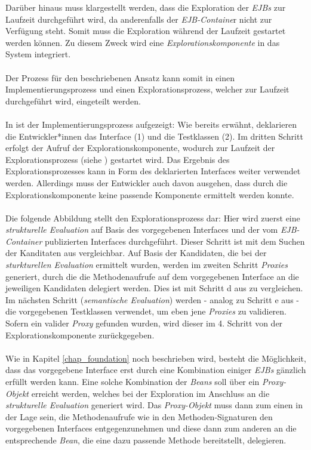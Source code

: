 Darüber hinaus muss klargestellt werden, dass die Exploration der \emph{EJBs} zur Laufzeit durchgeführt wird, da anderenfalls der \emph{EJB-Containe}r nicht zur Verfügung steht. Somit muss die Exploration während der Laufzeit gestartet werden können. Zu diesem Zweck wird eine \emph{Explorationskomponente} in das System integriert. 
\\\\
Der Prozess für den beschriebenen Ansatz kann somit in einen Implementierungsprozess und einen Explorationsprozess, welcher zur Laufzeit durchgeführt wird, eingeteilt werden.
\\\\
In  ist der Implementierungsprozess aufgezeigt:
\noindent
Wie bereits erwähnt, deklarieren die Entwickler*innen das \Gls{Interface} (1) und die Testklassen (2). Im dritten Schritt erfolgt der Aufruf der Explorationskomponente, wodurch zur Laufzeit der Explorationsprozess (siehe ) gestartet wird. Das Ergebnis des Explorationsprozesses kann in Form des deklarierten \Gls{Interface}s weiter verwendet werden. Allerdings muss der Entwickler auch davon ausgehen, dass durch die Explorationskomponente keine passende Komponente ermittelt werden konnte.
\\\\
Die folgende Abbildung stellt den Explorationsprozess dar:
\noindent
Hier wird zuerst eine \emph{strukturelle Evaluation} auf Basis des vorgegebenen \Gls{Interface}s und der vom \emph{EJB-Container} publizierten \Gls{Interface}s durchgeführt. 
Dieser Schritt ist mit dem Suchen der Kanditaten aus  vergleichbar. Auf Basis der Kandidaten, die bei der \emph{sturkturellen Evaluation} ermittelt wurden, werden im zweiten Schritt \emph{Proxies} generiert, durch die die Methodenaufrufe auf dem vorgegebenen \Gls{Interface} an die jeweiligen Kandidaten delegiert werden. Dies ist mit Schritt d aus  zu vergleichen. Im nächsten Schritt (\emph{semantische Evaluation}) werden - analog zu Schritt e aus  - die vorgegebenen Testklassen verwendet, um eben jene \emph{Proxies} zu validieren. Sofern ein valider \emph{Proxy} gefunden wurden, wird dieser im 4. Schritt von der Explorationskomponente zurückgegeben.
\\\\
Wie in Kapitel \ref{chap_foundation} noch beschrieben wird, besteht die Möglichkeit, dass das vorgegebene \Gls{Interface} erst durch eine Kombination einiger \emph{EJBs} gänzlich erfüllt werden kann. Eine solche Kombination der \emph{Beans} soll über ein \emph{Proxy-Objekt} erreicht werden, welches bei der Exploration im Anschluss an die \emph{strukturelle Evaluation} generiert wird. Das \emph{Proxy-Objekt} muss dann zum einen in der Lage sein, die Methodenaufrufe wie in den Methoden-Signaturen den vorgegebenen \Gls{Interface}s entgegenzunehmen und diese dann zum anderen an die entsprechende \emph{Bean}, die eine dazu passende Methode bereitstellt, delegieren.
